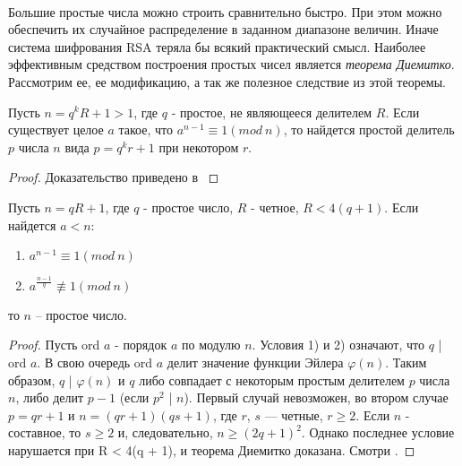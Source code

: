 \paragraph{} Большие простые числа можно строить сравнительно быстро. При этом можно обеспечить их случайное распределение в 
заданном диапазоне величин. Иначе система шифрования RSA теряла бы всякий практический смысл. Наиболее эффективным средством 
построения простых чисел является \textit{теорема Диемитко}. Рассмотрим ее, ее модификацию, а так же полезное следствие из этой теоремы.

  \begin{lemma}
    Пусть {$n = q^k R + 1 > 1$}, где {$q$} - простое, не являющееся делителем {$R$}. Если существует целое {$a$} такое, что
    {$a^{n-1} \equiv 1 (mod \: n)$}, то найдется простой делитель {$p$} числа {$n$} вида {$p=q^kr+1$} при некотором {$r$}.
    
      \begin{proof}
	Доказательство приведено в \cite[Пункт 12.3, страница 63]{cherem02}
      \end{proof}

  \end{lemma}


  \begin{theorem}[Диемитко] \label{eq:prime-theorem-diemitko}
      Пусть {$n = q R + 1$}, где {$q$} - простое число, {$R$} - четное, {$R < 4(q + 1)$}. Если найдется {$a < n$}:
      
	\begin{enumerate}
	 \item {$a^{n - 1} \equiv 1(mod \: n)$}
	 \item {$a^{\frac{n - 1}{q}} \not\equiv 1(mod \: n)$}
	\end{enumerate}
	
      то {$n$} – простое число.
      
      \begin{proof}
	Пусть ord $a$ - порядок $a$ по модулю $n$. Условия 1) и 2) означают, что $q$ | ord $a$. В свою очередь ord $a$ делит значение функции
	Эйлера $\varphi(n)$. Таким образом, $q$ | $\varphi(n)$ и $q$ либо совпадает с некоторым простым делителем $p$ числа $n$, либо делит $p - 1$ 
	(если $p^2$ | $n$). Первый случай невозможен, во втором случае $p = qr + 1$ и $n = (qr + 1)(qs + 1)$, где $r$, $s$ — четные, $r \ge 2$.
	Если $n$ - составное, то $s \ge 2$ и, следовательно, $n \ge (2q + 1)^2$. Однако последнее условие нарушается при R < 4(q + 1), и теорема 
	Диемитко доказана. Смотри \cite[Пункт 12.3, страница 63]{cherem02}.
      \end{proof}
  \end{theorem} 
 
